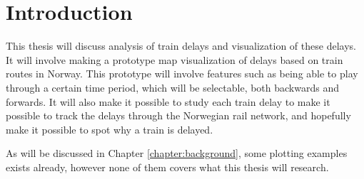 
\chapter{Introduction}
\label{chapter:introduction}

This thesis will discuss analysis of train delays and visualization of these
delays. It will involve making a prototype map visualization of delays based on
train routes in Norway. This prototype will involve features such as being able
to play through a certain time period, which will be selectable, both backwards
and forwards. It will also make it possible to study each train delay to make
it possible to track the delays through the Norwegian rail network, and
hopefully make it possible to spot why a train is delayed.

As will be discussed in Chapter \vref{chapter:background}, some plotting 
examples exists already, however none of them covers what this thesis will 
research.
